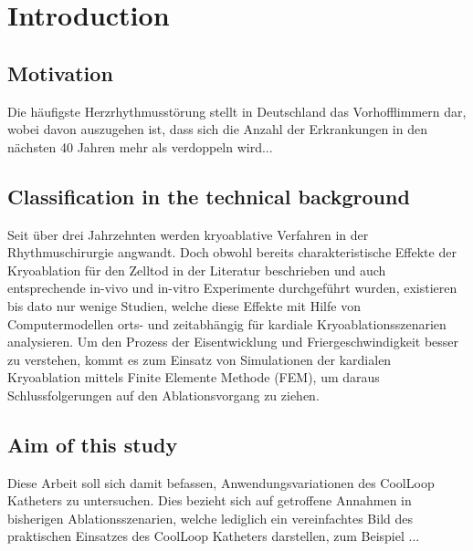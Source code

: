 \chapter{Introduction}
\label{sec:Introduction}
\section{Motivation}
\label{sec:04_Motivation}
Die häufigste Herzrhythmusstörung stellt in Deutschland das Vorhofflimmern dar, wobei davon auszugehen ist, dass sich die Anzahl der Erkrankungen in den nächsten 40 Jahren mehr als verdoppeln wird...

\newpage
\section{Classification in the technical background}
\label{sec:04_Backgroundclassification}
Seit über drei Jahrzehnten werden kryoablative Verfahren in der Rhythmuschirurgie angwandt. Doch obwohl bereits charakteristische Effekte der Kryoablation für den Zelltod in der Literatur beschrieben und auch entsprechende in-vivo und in-vitro Experimente durchgeführt wurden, existieren bis dato nur wenige Studien, welche diese Effekte mit Hilfe von Computermodellen orts- und zeitabhängig für kardiale Kryoablationsszenarien analysieren. Um den Prozess der Eisentwicklung und Friergeschwindigkeit besser zu verstehen, kommt es zum Einsatz von Simulationen der kardialen Kryoablation mittels Finite Elemente Methode (FEM), um daraus Schlussfolgerungen auf den Ablationsvorgang zu ziehen.


\newpage
\section{Aim of this study}
\label{sec:04_aim}
Diese Arbeit soll sich damit befassen, Anwendungsvariationen des CoolLoop\SymbReg{} Katheters zu untersuchen. Dies bezieht sich auf getroffene Annahmen in bisherigen Ablationsszenarien, welche lediglich ein vereinfachtes Bild des praktischen Einsatzes des CoolLoop\SymbReg{} Katheters darstellen, zum Beispiel ...